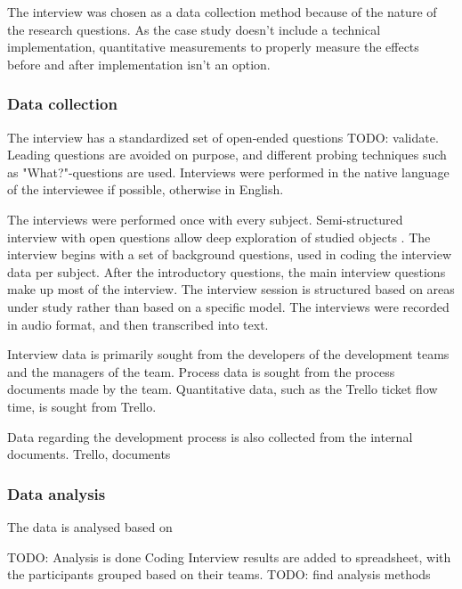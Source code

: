 \documentclass[english]{tktltiki2}
\theoremstyle{definition}
\theoremstyle{remark}
\begin{document}
The interview was chosen as a data collection method because of the nature of the research questions. As the case study doesn't include a technical implementation, quantitative measurements to properly measure the effects before and after implementation isn't an option. 

\subsubsection{Data collection}
The interview has a standardized set of open-ended questions TODO: validate. Leading questions are avoided on purpose, and different probing techniques such as "What?"-questions are used.    
Interviews were performed in the native language of the interviewee if possible, otherwise in English.

The interviews were performed once with every subject. Semi-structured interview with open questions allow deep exploration of studied objects \cite{runeson2009guidelines}. The interview begins with a set of background questions, used in coding the interview data per subject. After the introductory questions, the main interview questions make up most of the interview. The interview session is structured based on areas under study rather than based on a specific model. The interviews were recorded in audio format, and then transcribed into text.  

Interview data is primarily sought from the developers of the development teams and the managers of the team. Process data is sought from the process documents made by the team. Quantitative data, such as the Trello ticket flow time, is sought from Trello. 

Data regarding the development process is also collected from the internal documents.
Trello, documents


\subsubsection{Data analysis}
The data is analysed based on 

TODO: Analysis is done \cite{runeson2009guidelines}
Coding
Interview results are added to spreadsheet, with the participants grouped based on their teams. TODO: find analysis methods
\end{document}

